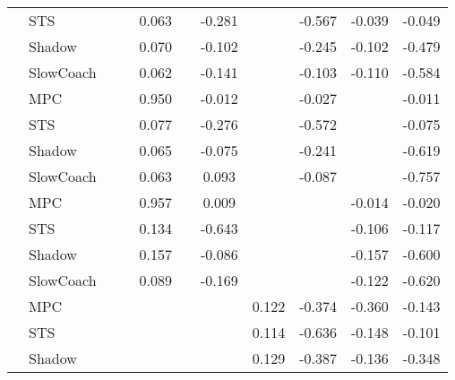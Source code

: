\begin{tabular}{|l|l|*{9}{c|}}
                                                           & STS &       &        &     0.063 &     & -0.281 &     &  -0.567 &  -0.039 &   -0.049 \\
                                                           & Shadow &       &        &     0.070 &     & -0.102 &     &  -0.245 &  -0.102 &   -0.479 \\
                                                           & SlowCoach &       &        &     0.062 &     & -0.141 &     &  -0.103 &  -0.110 &   -0.584 \\
\midrule
[False, False, True, False, True, False, True, False, True] & MPC &       &        &     0.950 &     & -0.012 &     &  -0.027 &      &   -0.011 \\
                                                           & STS &       &        &     0.077 &     & -0.276 &     &  -0.572 &      &   -0.075 \\
                                                           & Shadow &       &        &     0.065 &     & -0.075 &     &  -0.241 &      &   -0.619 \\
                                                           & SlowCoach &       &        &     0.063 &     &  0.093 &     &  -0.087 &      &   -0.757 \\
\midrule
[False, False, True, False, True, False, False, True, True] & MPC &       &        &     0.957 &     &  0.009 &     &      &  -0.014 &   -0.020 \\
                                                           & STS &       &        &     0.134 &     & -0.643 &     &      &  -0.106 &   -0.117 \\
                                                           & Shadow &       &        &     0.157 &     & -0.086 &     &      &  -0.157 &   -0.600 \\
                                                           & SlowCoach &       &        &     0.089 &     & -0.169 &     &      &  -0.122 &   -0.620 \\
\midrule
[False, False, False, False, False, True, True, True, True] & MPC &       &        &        &     &     &  0.122 &  -0.374 &  -0.360 &   -0.143 \\
                                                           & STS &       &        &        &     &     &  0.114 &  -0.636 &  -0.148 &   -0.101 \\
                                                           & Shadow &       &        &        &     &     &  0.129 &  -0.387 &  -0.136 &   -0.348 \\

\end{tabular}
